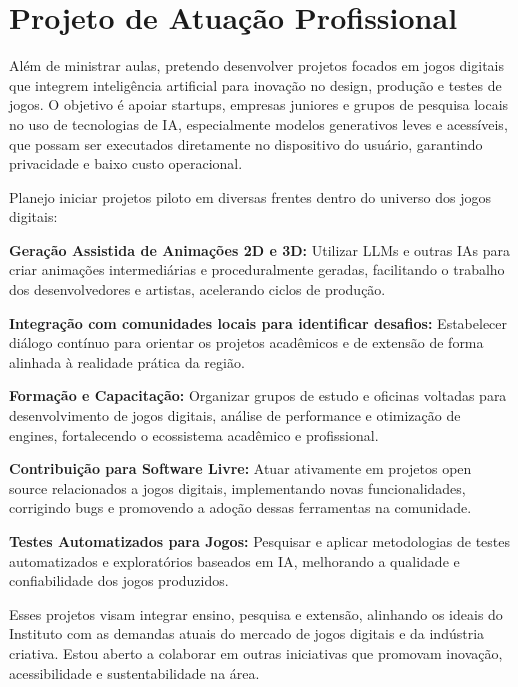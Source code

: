 \documentclass[10pt,a4paper,oneside]{book}
\begin{document}
\chapter{Projeto de Atuação Profissional}
\label{cap_proje}

Além de ministrar aulas, pretendo desenvolver projetos focados em jogos digitais que integrem inteligência artificial
para inovação no design, produção e testes de jogos. O objetivo é apoiar startups, empresas juniores e grupos de pesquisa
locais no uso de tecnologias de IA, especialmente modelos generativos leves e acessíveis, que possam ser executados
diretamente no dispositivo do usuário, garantindo privacidade e baixo custo operacional.

Planejo iniciar projetos piloto em diversas frentes dentro do universo dos jogos digitais:

\textbf{Geração Assistida de Animações 2D e 3D:} Utilizar LLMs e outras IAs para criar animações intermediárias e
proceduralmente geradas, facilitando o trabalho dos desenvolvedores e artistas, acelerando ciclos de produção.

\textbf{Integração com comunidades locais para identificar desafios:}
Estabelecer diálogo contínuo para orientar os projetos acadêmicos e de extensão de forma alinhada à realidade prática da região.

\textbf{Formação e Capacitação:} Organizar grupos de estudo e oficinas voltadas para desenvolvimento de jogos digitais,
análise de performance e otimização de engines, fortalecendo o ecossistema acadêmico e profissional.

\textbf{Contribuição para Software Livre:} Atuar ativamente em projetos open source relacionados a jogos digitais,
implementando novas funcionalidades, corrigindo bugs e promovendo a adoção dessas ferramentas na comunidade.

\textbf{Testes Automatizados para Jogos:} Pesquisar e aplicar metodologias de testes automatizados e exploratórios
baseados em IA, melhorando a qualidade e confiabilidade dos jogos produzidos.

Esses projetos visam integrar ensino, pesquisa e extensão, alinhando os ideais do Instituto com as demandas atuais do mercado de jogos digitais e da indústria criativa. Estou aberto a colaborar em outras iniciativas que promovam inovação, acessibilidade e sustentabilidade na área.





\end{document}
